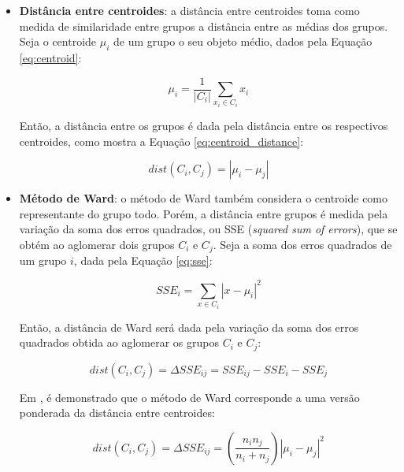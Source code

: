 \begin{itemize}
	\item \textbf{Distância entre centroides}: a distância entre centroides toma
	como medida de similaridade entre grupos a distância entre as médias dos
	grupos. Seja o centroide $\mu_i$ de um grupo o seu objeto médio, dados
	pela Equação \ref{eq:centroid}:
	
	\begin{equation}
		\mu_i = \frac{1}{\left|C_i\right|} \sum_{x_i \in C_i}{x_i}
		\label{eq:centroid}
	\end{equation}
	
	Então, a distância entre os grupos é dada pela distância entre os respectivos
	centroides, como mostra a Equação \ref{eq:centroid_distance}:
	
	\begin{equation}
		dist\left(C_i,C_j\right) = \left|\mu_i - \mu_j\right|
		\label{eq:centroid_distance}
	\end{equation}
	
	\item \textbf{Método de Ward}: o método de Ward também considera o centroide
	como representante do grupo todo. Porém, a distância entre grupos é
	medida pela variação da soma dos erros quadrados, ou SSE (\emph{squared sum
	of errors}), que se obtém ao aglomerar dois grupos $C_i$ e $C_j$. Seja a soma
	dos erros quadrados de um grupo $i$, dada pela Equação \ref{eq:sse}:
	
	\begin{equation}
		SSE_i = \sum_{x \in C_i}{{\left| x - \mu_i \right|}^{2}}
		\label{eq:sse}
	\end{equation}
	
	Então, a distância de Ward será dada pela variação da soma dos erros quadrados
	obtida ao aglomerar os grupos $C_i$ e $C_j$:
	
	\begin{equation}
		dist(C_i, C_j) = \Delta SSE_{ij} = SSE_{ij} - SSE_i - SSE_j
		\label{eq:ward}
	\end{equation}
	
	Em \cite{zaki2014data}, é demonstrado que o método de Ward corresponde a uma
	versão ponderada da distância entre centroides:
	
	\begin{equation}
		dist(C_i, C_j) =
			\Delta SSE_{ij} =
			\left( \frac{n_i n_j}{n_i + n_j} \right)
				{\left| \mu_i - \mu_j  \right|}^{2}
		\label{eq:ward_weighted}
	\end{equation}
	
\end{itemize}

